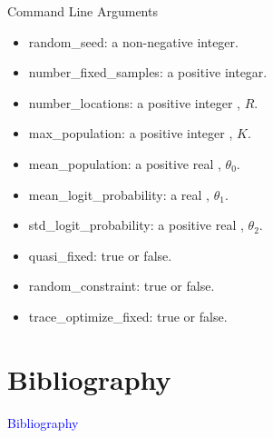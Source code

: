 \documentclass{beamer}
\newcommand{\Blue}[1]{\textcolor{blue}{#1}}
\newcommand{\Section}[1]{
	\section{#1}
	\begin{frame}
	\begin{center}
	\Blue{ \Large{#1} }
	\end{center}
	\end{frame}
}
\begin{document}
\begin{frame}{Command Line Arguments}
\fontsize{10}{11}\selectfont
\begin{itemize}

\item
random\_seed: \hspace{4em} a non-negative integer.
\pause

\item
number\_fixed\_samples: \hspace{0.2em} a positive integar.
\pause

\item
number\_locations: \hspace{2em} a positive integer , $R$.
\pause

\item
max\_population: \hspace{2.7em} a positive integer , $K$.
\pause

\item
mean\_population: \hspace{2.2em} a positive real , $\theta_0$.
\pause

\item
mean\_logit\_probability: \hspace{0em} a real , $\theta_1$.
\pause

\item
std\_logit\_probability: \hspace{1em} a positive real , $\theta_2$.
\pause

\item
quasi\_fixed: \hspace{4.8em} true or false.
\pause

\item
random\_constraint: \hspace{1.6em} true or false.
\pause

\item
trace\_optimize\_fixed: \hspace{1em} true or false.
\pause

\end{itemize}
\end{frame}


\Section{Bibliography}
%
{}

\end{document}
